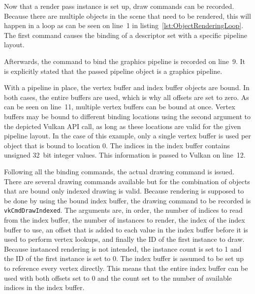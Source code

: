       Now that a render pass instance is set up, draw commands can be recorded.
      Because there are multiple objects in the scene that need to be rendered, this will happen in a loop as can be seen on line~1 in listing~\ref{lst:ObjectRenderingLoop}.
      The first command causes the binding of a descriptor set with a specific pipeline layout.

      Afterwards, the command to bind the graphics pipeline is recorded on line~9.
      It is explicitly stated that the passed pipeline object is a graphics pipeline.

      With a pipeline in place, the vertex buffer and index buffer objects are bound.
      In both cases, the entire buffers are used, which is why all offsets are set to zero.
      As can be seen on line~11, multiple vertex buffers can be bound at once.
      Vertex buffers may be bound to different binding locations using the second argument to the depicted Vulkan API call, as long as these locations are valid for the given pipeline layout.
      In the case of this example, only a single vertex buffer is used per object that is bound to location 0.
      The indices in the index buffer contains unsigned 32~bit integer values.
      This information is passed to Vulkan on line~12.

      Following all the binding commands, the actual drawing command is issued.
      There are several drawing commands available but for the combination of objects that are bound only indexed drawing is valid.
      Because rendering is supposed to be done by using the bound index buffer, the drawing command to be recorded is \lstinline{vkCmdDrawIndexed}.
      The arguments are, in order, the number of indices to read from the index buffer, the number of instances to render, the index of the index buffer to use, an offset that is added to each value in the index buffer before it is used to perform vertex lookups, and finally the ID of the first instance to draw.
      Because instanced rendering is not intended, the instance count is set to 1 and the ID of the first instance is set to 0.
      The index buffer is assumed to be set up to reference every vertex directly.
      This means that the entire index buffer can be used with both offsets set to 0 and the count set to the number of available indices in the index buffer.

